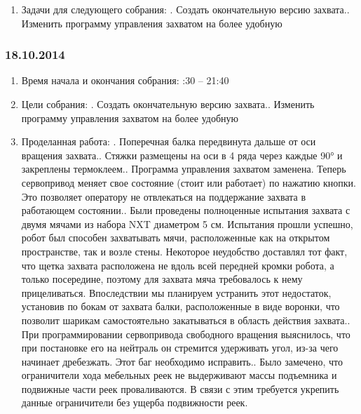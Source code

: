 \documentclass[11pt]{article}
\begin{document}
\begin{enumerate}
            \item Задачи для следующего собрания:
            .   Создать окончательную версию захвата..   Изменить программу управления захватом на более удобную
            
         \end{enumerate}
         \newpage
         \subsubsection{18.10.2014}
         \begin{enumerate}
            \item Время начала и окончания собрания:
            :30 – 21:40
            \item Цели собрания:
            .   Создать окончательную версию захвата..   Изменить программу управления захватом на более удобную
            
            \item Проделанная работа:
            .   Поперечная балка передвинута дальше от оси вращения захвата..   Стяжки размещены на оси в 4 ряда через каждые 90° и закреплены термоклеем..   Программа управления захватом заменена. Теперь сервопривод меняет свое состояние (стоит или работает) по нажатию кнопки. Это позволяет оператору не отвлекаться на поддержание захвата в работающем состоянии..   Были проведены полноценные испытания захвата с двумя мячами из набора NXT диаметром 5 см. Испытания прошли успешно, робот был способен захватывать мячи, расположенные как на открытом пространстве, так и возле стены. Некоторое неудобство доставлял тот факт, что щетка захвата расположена не вдоль всей передней кромки робота, а только посередине, поэтому для захвата мяча требовалось к нему прицеливаться. Впоследствии мы планируем устранить этот недостаток, установив по бокам от захвата балки, расположенные в виде воронки, что позволит шарикам самостоятельно закатываться в область действия захвата..   При программировании сервопривода свободного вращения выяснилось, что при постановке его на нейтраль он стремится удерживать угол, из-за чего начинает дребезжать. Этот баг необходимо исправить..   Было замечено, что ограничители хода мебельных реек не выдерживают массы подъемника и подвижные части реек проваливаются. В связи с этим требуется укрепить данные ограничители без ущерба подвижности  реек.
            

\end{enumerate}
\end{document}
